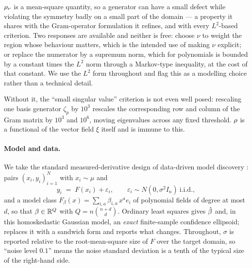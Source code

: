 \begin{remark}
$\rho_\nu$ is a mean-square quantity, so a generator can have a small defect
while violating the symmetry badly on a small part of the domain --- a property
it shares with the Gram-operator formulation it refines, and with every
$L^2$-based criterion. Two responses are available and neither is free: choose
$\nu$ to weight the region whose behaviour matters, which is the intended use of
making $\nu$ explicit; or replace the numerator by a supremum norm, which for
polynomials is bounded by a constant times the $L^2$ norm through a Markov-type
inequality, at the cost of that constant. We use the $L^2$ form throughout and
flag this as a modelling choice rather than a technical detail.
\end{remark}

\begin{remark}
Without it, the ``small singular value'' criterion is not even well posed:
rescaling one basis generator $\zeta_p$ by $10^{3}$ rescales the corresponding
row and column of the Gram matrix by $10^{3}$ and $10^{6}$, moving eigenvalues
across any fixed threshold. $\rho$ is a functional of the vector field $\xi$
itself and is immune to this.
\end{remark}

\paragraph{Model and data.} We take the standard measured-derivative design of
data-driven model discovery \citep{brunton2016discovering}: pairs
$(x_i, y_i)_{i=1}^N$ with $x_i \sim \mu$ and
\begin{equation}
  y_i \;=\; F(x_i) + \varepsilon_i , \qquad \varepsilon_i \sim N(0, \sigma^2 I_n)
  \ \text{i.i.d.},
  \label{eq:model}
\end{equation}
and a model class $F_\beta(x) = \sum_{i,a} \beta_{i,a}\, x^{a} e_i$ of
polynomial fields of degree at most $d$, so that $\beta \in \mathbb{R}^Q$ with
$Q = n\binom{n+d}{d}$. Ordinary least squares gives $\hat{\beta}$ and, in this
homoskedastic Gaussian model, an \emph{exact} finite-sample confidence
ellipsoid;  replaces it with a sandwich form and reports
what changes. Throughout, $\sigma$ is reported relative to the
root-mean-square size of $F$ over the target domain, so ``noise level $0.1$''
means the noise standard deviation is a tenth of the typical size of the
right-hand side.

